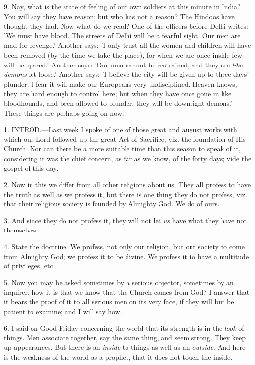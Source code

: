 9. Nay, what is the state of feeling of our own
soldiers at this minute in India? You will say they have reason; but
who has not a reason? The Hindoos have thought they had. Now what do
we read? One of the officers before Delhi writes: 'We must have blood.
The streets of Delhi will be a fearful sight. Our men are mad for
revenge.' Another says: 'I only trust all the women and children will
have been removed (by the time we take the place), for when we are
once inside few will be spared.' Another says: 'Our men cannot be
restrained, and they are \emph{like demons} let loose.' Another says:
'I believe the city will be given up to three days' plunder. I fear it
will make our Europeans very undisciplined. Heaven knows, they are
hard enough to control here; but when they have once gone in like
bloodhounds, and been allowed to plunder, they will be downright
demons.' These things are perhaps going on now.


1. INTROD.—Last
week I spoke of one of those great and august works with which our
Lord followed up the great Act of Sacrifice, viz. the foundation of
His Church. Nor can there be a more suitable time than this season to
speak of it, considering it was the chief concern, as far as we know,
of the forty days; vide the gospel of this day.

2. Now in this we differ from all other religions
about us. They all profess to have the truth as well as we profess it,
but there is one thing they do not profess, viz. that their religious
society is founded by Almighty God. We do of ours.

3. And since they do not profess it, they will
not let \emph{us} have what they have not themselves.

4. State the doctrine. We profess, not only our
religion, but our society to come from Almighty God; we profess it to
be divine. We profess it to have a multitude of privileges, etc.

5. Now you may be asked sometimes by a serious
objector, sometimes by an inquirer, how it is that we know that the
Church comes from God? I answer that it bears the proof of it to all
serious men on its very face, if they will but be patient to examine;
and I will say how.

6. I said on Good Friday concerning the world
that its strength is in the \emph{look} of things. Men associate
together, say the same thing, and seem strong. They keep up
appearances. But there is an \emph{inside} to things as well as an \emph{outside}.
And here is the weakness of the world as a prophet, that it does
not touch the inside.

